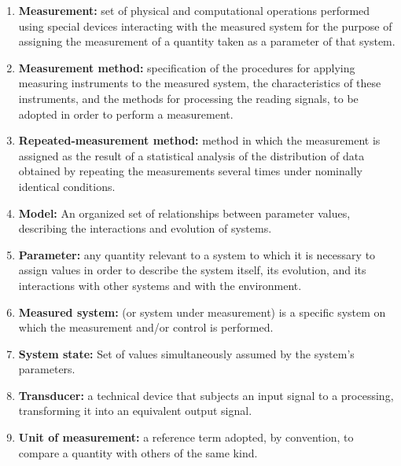 \documentclass[../main.tex]{subfiles}
\begin{document}
\begin{enumerate}
	\item[\textbf{-}]\textbf{Measurement:} set of physical and computational operations performed using special devices interacting with the measured system for the purpose of assigning the measurement of a quantity taken as a parameter of that system.

	\item[\textbf{-}]\textbf{Measurement method:} specification of the procedures for applying measuring instruments to the measured system, the characteristics of these instruments, and the methods for processing the reading signals, to be adopted in order to perform a measurement.

	\item[\textbf{-}]\textbf{Repeated-measurement method:} method in which the measurement is assigned as the result of a statistical analysis of the distribution of data obtained by repeating the measurements several times under nominally identical conditions.
	
	\item[\textbf{-}]\textbf{Model:} An organized set of relationships between parameter values, describing the interactions and evolution of systems. 
	
	\item[\textbf{-}]\textbf{Parameter:} any quantity relevant to a system to which it is necessary to assign values in order to describe the system itself, its evolution, and its interactions with other systems and with the environment.
 
	\item[\textbf{-}]\textbf{Measured system:} (or system under measurement) is a specific system on which the measurement and/or control is performed.

	\item[\textbf{-}]\textbf{System state:} Set of values simultaneously assumed by the system’s parameters.
	\item[\textbf{-}]\textbf{Transducer:} a technical device that subjects an input signal to a processing, transforming it into an equivalent output signal.

	\item[\textbf{-}]\textbf{Unit of measurement:} a reference term adopted, by convention, to compare a quantity with others of the same kind.


\end{enumerate}


\end{document}
